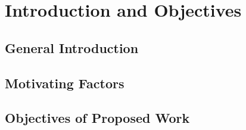 \chapter{Introduction and Objectives}

\section{General Introduction}
\section{Motivating Factors}
\section{Objectives of Proposed Work}
